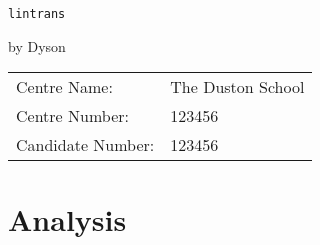 \documentclass[a4paper]{article}
\begin{document}

\begin{center}
	\vspace*{6.5cm}

	\Huge{\texttt{lintrans}}

	\vspace{0.8cm}

	\Large{by Dyson}

	\vfill
\end{center}

\large{
\begin{tabular}{ll}
Centre Name:& The Duston School\\
Centre Number:& 123456\\
Candidate Number:& 123456
\end{tabular}
}

\thispagestyle{empty}
\newpage



\thispagestyle{fancy}
\cfoot{\thepage}

\tableofcontents
\newpage



\setlength{\parindent}{0em}
\setlength{\parskip}{1em}



\section{Analysis\label{section:analysis}}




\newpage


\printbibliography

\end{document}

